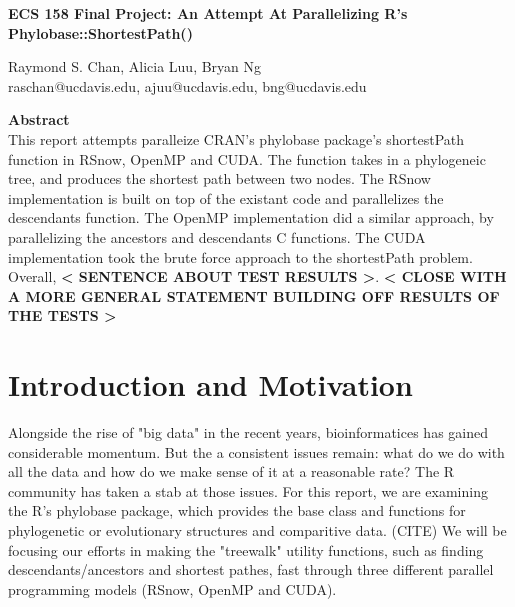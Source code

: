 \documentclass[11pt,letterpaper]{article}
\begin{document}
\begin{center}
{\huge \textbf{ECS 158 Final Project: An Attempt At Parallelizing R's Phylobase::ShortestPath()}\\
\vspace{5mm}
\begin{Large}
Raymond S. Chan, Alicia Luu, Bryan Ng\\
raschan@ucdavis.edu, ajuu@ucdavis.edu, bng@ucdavis.edu\\
\end{Large}}
\end{center}


\vspace{5mm}

\begin{center}
	\begin{large}
		\textbf{Abstract}\\
		This report attempts paralleize CRAN's phylobase package's shortestPath function in RSnow, OpenMP and CUDA. The function takes in a phylogeneic tree, and produces the shortest path between two nodes. The RSnow implementation is built on top of the existant code and parallelizes the descendants function. The OpenMP implementation did a similar approach, by parallelizing the ancestors and descendants C functions. The CUDA implementation took the brute force approach to the  shortestPath problem. Overall, \textbf{< SENTENCE ABOUT TEST RESULTS >}. \textbf{< CLOSE WITH A MORE GENERAL STATEMENT BUILDING OFF RESULTS OF THE TESTS >} 
	\end{large}
	

\end{center}

\section{Introduction and Motivation}
 
Alongside the rise of "big data" in the recent years, bioinformatices has gained considerable momentum. But the a consistent issues remain: what do we do with all the data and how do we make sense of it at a reasonable rate? The R community has taken a stab at those issues. For this report, we are examining the R's phylobase package, which provides the base class and functions for phylogenetic or evolutionary structures and comparitive data. (CITE) We will be focusing our efforts in making the "treewalk" utility functions, such as finding descendants/ancestors and shortest pathes, fast through three different parallel programming models (RSnow, OpenMP and CUDA).  
\end{document}

